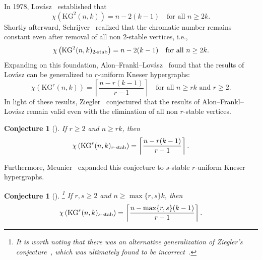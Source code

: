\documentclass[preprint,12pt,3p]{elsarticle}
\newtheorem{conjecture}[theorem]{Conjecture}
\begin{document}
In 1978, Lov\'{a}sz~\cite{Lo78} established that
\[
\chi\left(\mathrm{KG}^2(n,k)\right)=n-2(k-1)\quad \text{for all } n\geq 2k.
\] 
Shortly afterward, Schrijver~\cite{Sch78} realized that the chromatic number remains constant even after removal of all non 2-stable vertices, i.e.,
\[
\chi\left(\mathrm{KG}^2(n,k)_{2\textup{-stab}}\right)=n-2(k-1)\quad \text{for all } n\geq 2k.
\]
Expanding on this foundation, Alon--Frankl--Lov\'{a}sz~\cite{alon1986chromatic} found that the results of Lov\'{a}sz can be generalized to $r$-uniform Kneser hypergraphs:
\[
\chi \left(\mathrm{KG}^{r}(n,k)\right)=\left\lceil\frac{n-r(k-1)}{r-1}\right\rceil\quad\text{for all } n\geq rk \text{ and } r\geq 2.
\]
In light of these results, Ziegler~\cite{ziegler2002generalized} conjectured that the results of Alon--Frankl--Lov\'{a}sz remain valid even with the elimination of all non $r$-stable vertices.

\begin{conjecture}[\cite{ziegler2002generalized}]\label{Conj: zig}
If $r\geq 2$ and $n\geq rk$, then
\[
\chi\left(\mathrm{KG}^r(n,k)_{r\textup{-stab}}\right)=\left\lceil\frac{n-r(k-1)}{r-1}\right\rceil.
\]
\end{conjecture}

Furthermore, Meunier~\cite{Me11} expanded this conjecture to $s$-stable $r$-uniform Kneser hypergraphs.

\begin{conjecture}[\cite{Me11}]\label{Conj: Meu}\footnote{It is worth noting that there was an alternative generalization of Ziegler's conjecture~\cite{frick2020chromatic}, which was ultimately found to be incorrect~\cite{daneshpajouh2023counterexample}.}
If $r, s\geq 2$ and $n\geq \max\{r,s\}k$, then
\[
\chi \left(\mathrm{KG}^r(n,k)_{s\textup{-stab}}\right)=\left\lceil\frac{n-\max\{r,s\}(k-1)}{r-1}\right\rceil.
\]
\end{conjecture}
\end{document}
